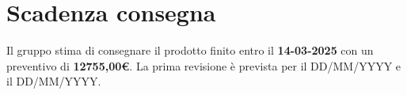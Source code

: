\section{Scadenza consegna}

Il gruppo stima di consegnare il prodotto finito entro il \textbf{14-03-2025} con un preventivo di \textbf{12755,00\euro}. La prima revisione è prevista per il DD/MM/YYYY e il DD/MM/YYYY.